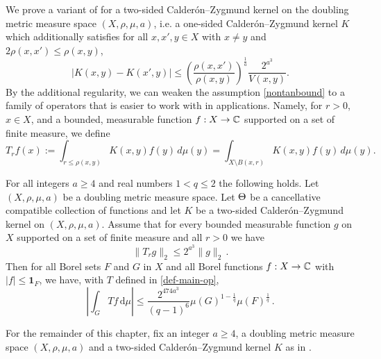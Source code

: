 We prove a variant of  for a two-sided Calder\'on--Zygmund kernel on the doubling metric measure space $(X,\rho,\mu,a)$, i.e. a one-sided Calder\'on--Zygmund kernel $K$ which additionally satisfies for all $x,x',y\in X$ with $x\neq y$ and $2\rho(x,x') \leq \rho(x,y)$,
\begin{equation}
    \label{eqkernel-x-smooth}
    |K(x,y) - K(x',y)| \leq \left(\frac{\rho(x,x')}{\rho(x,y)}\right)^{\frac{1}{a}}\frac{2^{a^3}}{V(x,y)}.
\end{equation}
By the additional regularity, we can weaken the assumption \eqref{nontanbound} to a family of operators that is easier to work with in applications.
Namely, for $r > 0$, $x\in X$, and a bounded, measurable function $f:X\to\mathbb{C}$ supported on a set of finite measure, we define
\begin{equation}
\label{def-T-r}
T_r f(x):= \int_{r\le\rho(x,y)} K(x,y) f(y) \, d\mu(y) = \int_{X\setminus B(x,r)} K(x,y) f(y) \, d\mu(y).
\end{equation}
\begin{theorem}
    \label{two-sided-metric-space-Carleson}
    \leanok
        For all  integers $a \ge  4$ and real numbers $1<q\le 2$
        the following holds.
        Let $(X,\rho,\mu,a)$ be a doubling metric measure space. Let  ${\Theta}$ be a
        cancellative compatible  collection of functions and let $K$ be a two-sided Calder\'on--Zygmund kernel on $(X,\rho,\mu,a)$. Assume  that for every bounded measurable function $g$ on $X$ supported on a set of finite measure and all $r>0$ we have
      \begin{equation}\label{two-sided-Hr-bound-assumption}
            \|T_r g\|_{2} \leq 2^{a^3} \|g\|_2\,.
        \end{equation}
        Then for all Borel sets $F$ and $G$ in $X$ and
        all Borel functions $f:X\to \mathbb{C}$ with
        $|f|\le \mathbf{1}_F$, we have, with $T$ defined in \eqref{def-main-op},
      \begin{equation}
        \label{two-sided-resweak}
            \left|\int_{G} T f \, \mathrm{d}\mu\right| \leq \frac{2^{474a^3}}{(q-1)^6} \mu(G)^{1-\frac{1}{q}} \mu(F)^{\frac{1}{q}}\, .
        \end{equation}
\end{theorem}

For the remainder of this chapter, fix an integer $a\ge 4$, a doubling metric measure space $(X,\rho,\mu,a)$ and a two-sided Calder\'on--Zygmund kernel $K$ as in .

